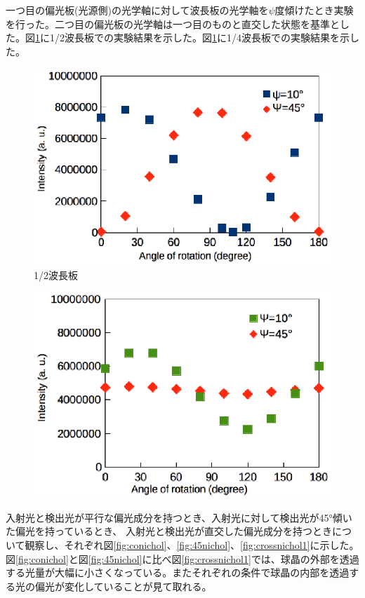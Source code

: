 \documentclass[11pt,a4]{jarticle}
\begin{document}
一つ目の偏光板(光源側)の光学軸に対して波長板の光学軸を$\psi$度傾けたとき実験を行った。二つ目の偏光板の光学軸は一つ目のものと直交した状態を基準とした。図\ref{fig:HW}に1/2波長板での実験結果を示した。図\ref{fig:HW}に1/4波長板での実験結果を示した。
\begin{figure}[htbp]
   \begin{center}
    \includegraphics[width=0.9\hsize]{./HW.eps}
    \caption{1/2波長板}
     \label{fig:HW}
   \end{center}
\end{figure}
\begin{figure}[htbp]
   \begin{center}
    \includegraphics[width=0.9\hsize]{./QW.eps}
    \caption{}
     \label{fig:QW}
   \end{center}
\end{figure}


入射光と検出光が平行な偏光成分を持つとき、入射光に対して検出光が45°傾いた偏光を持っているとき、
入射光と検出光が直交した偏光成分を持つときについて観察し、それぞれ図\ref{fig:conichol}、\ref{fig:45nichol}、\ref{fig:crossnichol1}に示した。図\ref{fig:conichol}と図\ref{fig:45nichol}に比べ図\ref{fig:crossnichol1}では、球晶の外部を透過する光量が大幅に小さくなっている。またそれぞれの条件で球晶の内部を透過する光の偏光が変化していることが見て取れる。
\end{document}
